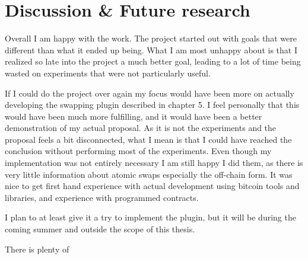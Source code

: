 \chapter{Discussion \& Future research}
Overall I am happy with the work. The project started out with goals that were different than what it ended up being. What I am most unhappy about is that I realized so late into the project a much better goal, leading to a lot of time being wasted on experiments that were not particularly useful. 

If I could do the project over again my focus would have been more on actually developing the swapping plugin described in chapter 5. I feel personally that this would have been much more fulfilling, and it would have been a better demonstration of my actual proposal. As it is not the experiments and the proposal feels a bit disconnected, what I mean is that I could have reached the conclusion without performing most of the experiments. Even though my implementation was not entirely necessary I am still happy I did them, as there is very little information about atomic swaps especially the off-chain form. It was nice to get first hand experience with actual development using bitcoin tools and libraries, and experience with programmed contracts. 

I plan to at least give it a try to implement the plugin, but it will be during the coming summer and outside the scope of this thesis. 

There is plenty of 